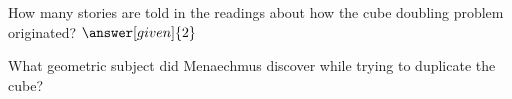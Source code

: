 \documentclass{ximera}
\begin{document}
\begin{question}
How many stories are told in the readings about how the cube doubling problem originated?  $\answer[given]{2}$
\end{question}



\begin{question}
What geometric subject did Menaechmus discover while trying to duplicate the cube?
\begin{multipleChoice}
\end{multipleChoice}
\end{question}


\end{document}
